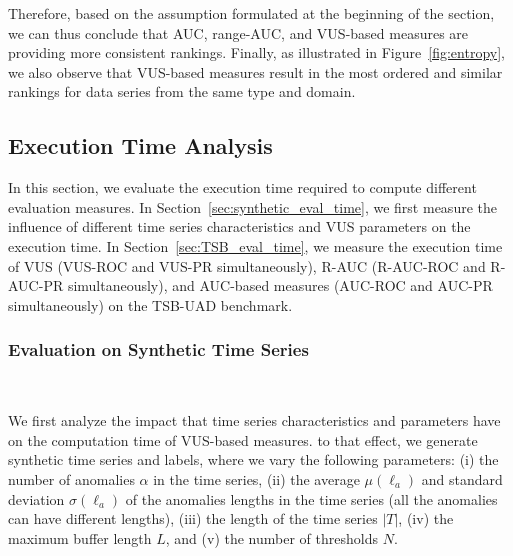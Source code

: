 Therefore, based on the assumption formulated at the beginning of the section, we can thus conclude that AUC, range-AUC, and VUS-based measures are providing more consistent rankings. Finally, as illustrated in Figure~\ref{fig:entropy}, we also observe that VUS-based measures result in the most ordered and similar rankings for data series from the same type and domain.










\subsection{Execution Time Analysis}
\label{sec:exectime}

In this section, we evaluate the execution time required to compute different evaluation measures. 
In Section~\ref{sec:synthetic_eval_time}, we first measure the influence of different time series characteristics and VUS parameters on the execution time. In Section~\ref{sec:TSB_eval_time}, we  measure the execution time of VUS (VUS-ROC and VUS-PR simultaneously), R-AUC (R-AUC-ROC and R-AUC-PR simultaneously), and AUC-based measures (AUC-ROC and AUC-PR simultaneously) on the TSB-UAD benchmark. 


\subsubsection{Evaluation on Synthetic Time Series}\hfill\\
\label{sec:synthetic_eval_time}

We first analyze the impact that time series characteristics and parameters have on the computation time of VUS-based measures. 
to that effect, we generate synthetic time series and labels, where we vary the following parameters: (i) the number of anomalies {\bf$\alpha$} in the time series, (ii) the average \textbf{$\mu(\ell_a)$} and standard deviation $\sigma(\ell_a)$ of the anomalies lengths in the time series (all the anomalies can have different lengths), (iii) the length of the time series \textbf{$|T|$}, (iv) the maximum buffer length \textbf{$L$}, and (v) the number of thresholds \textbf{$N$}.


